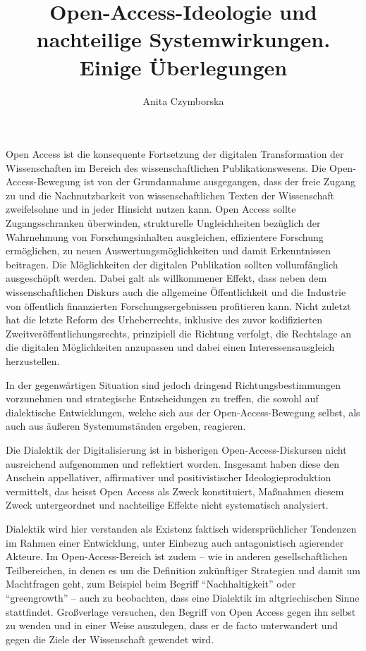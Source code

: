 \documentclass[a4paper,
fontsize=11pt,
oneside,
numbers=noperiodatend,
parskip=half-,
bibliography=totoc,
final
]{scrartcl}
\title{\LARGE{Open-Access-Ideologie und nachteilige Systemwirkungen. Einige Überlegungen}} %
\author{Anita Czymborska} %
\date{}
\begin{document}
\maketitle
\thispagestyle{fancyplain} 


Open Access ist die konsequente Fortsetzung der digitalen Transformation
der Wissenschaften im Bereich des wissenschaftlichen Publikationswesens.
Die Open-Access-Bewegung ist von der Grundannahme ausgegangen, dass der
freie Zugang zu und die Nachnutzbarkeit von wissenschaftlichen Texten
der Wissenschaft zweifelsohne und in jeder Hinsicht nutzen kann. Open
Access sollte Zugangsschranken überwinden, strukturelle Ungleichheiten
bezüglich der Wahrnehmung von Forschungsinhalten ausgleichen,
effizientere Forschung ermöglichen, zu neuen Auswertungsmöglichkeiten
und damit Erkenntnissen beitragen. Die Möglichkeiten der digitalen
Publikation sollten vollumfänglich ausgeschöpft werden. Dabei galt als
willkommener Effekt, dass neben dem wissenschaftlichen Diskurs auch die
allgemeine Öffentlichkeit und die Industrie von öffentlich finanzierten
Forschungsergebnissen profitieren kann. Nicht zuletzt hat die letzte
Reform des Urheberrechts, inklusive des zuvor kodifizierten
Zweitveröffentlichungsrechts, prinzipiell die Richtung verfolgt, die
Rechtslage an die digitalen Möglichkeiten anzupassen und dabei einen
Interessensausgleich herzustellen.

In der gegenwärtigen Situation sind jedoch dringend
Richtungsbestimmungen vorzunehmen und strategische Entscheidungen zu
treffen, die sowohl auf dialektische Entwicklungen, welche sich aus der
Open-Access-Bewegung selbst, als auch aus äußeren Systemumständen
ergeben, reagieren.

Die Dialektik der Digitalisierung ist in bisherigen
Open-Access-Diskursen nicht ausreichend aufgenommen und reflektiert
worden. Insgesamt haben diese den Anschein appellativer, affirmativer
und positivistischer Ideologieproduktion vermittelt, das heisst Open
Access als Zweck konstituiert, Maßnahmen diesem Zweck untergeordnet und
nachteilige Effekte nicht systematisch analysiert.

Dialektik wird hier verstanden als Existenz faktisch widersprüchlicher
Tendenzen im Rahmen einer Entwicklung, unter Einbezug auch
antagonistisch agierender Akteure. Im Open-Access-Bereich ist zudem --
wie in anderen gesellschaftlichen Teilbereichen, in denen es um die
Definition zukünftiger Strategien und damit um Machtfragen geht, zum
Beispiel beim Begriff \enquote{Nachhaltigkeit} oder
\enquote{greengrowth} -- auch zu beobachten, dass eine Dialektik im
altgriechischen Sinne stattfindet. Großverlage versuchen, den Begriff
von Open Access gegen ihn selbst zu wenden und in einer Weise
auszulegen, dass er de facto unterwandert und gegen die Ziele der
Wissenschaft gewendet wird.
\end{document}

